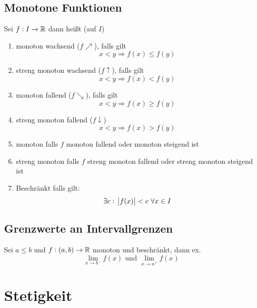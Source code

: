 \subsection{Monotone Funktionen}
Sei $f: I \rightarrow \mathbb{R}$ dann heißt (auf $I$)
\begin{enumerate}[label= (\alph*)]
    \item monoton wachsend ($f \nearrow$), falls gilt
        \begin{equation*}
            x < y \Rightarrow f(x) \leq f(y)
        \end{equation*}
    \item streng monoton wachsend ($f \uparrow$), falls gilt
        \begin{equation*}
            x < y \Rightarrow f(x) < f(y)
        \end{equation*}
    \item monoton fallend ($f \searrow$), falls gilt
        \begin{equation*}
            x < y \Rightarrow f(x) \geq f(y)
        \end{equation*}
    \item streng monoton fallend ($f \downarrow$)
        \begin{equation*}
            x < y \Rightarrow f(x) > f(y)
        \end{equation*}
    \item monoton falls $f$ monoton fallend oder monoton steigend ist
    \item streng monoton falls $f$ streng monoton fallend oder streng monoton
        steigend ist
    \item Beschränkt falls gilt:
        \begin{equation*}
            \exists c:\ \abs{f(x)} < c\ \forall x \in I
        \end{equation*}
\end{enumerate}

\subsection{Grenzwerte an Intervallgrenzen}
Sei $a \leq b$ und $f: (a, b) \rightarrow \mathbb{R}$ monoton und beschränkt, dann
ex.
\begin{equation*}
    \lim_{x \rightarrow b^-} f(x) \text{ und } \lim_{x \rightarrow a^+} f(x)
\end{equation*}

\section{Stetigkeit}

